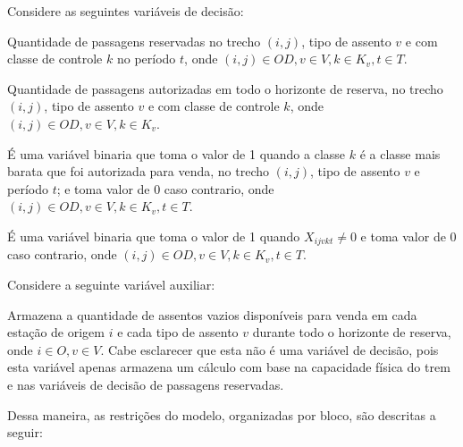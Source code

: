 Considere as seguintes variáveis de decisão:
\begin{description}[style=unboxed, leftmargin=2.5cm, labelindent=1.5cm]
	\setlength{\itemsep}{-2.2em} %
	\setlength{\parskip}{0em} %
	\item[$X_{ijvkt}:$] Quantidade de passagens reservadas no trecho $(i,j)$, tipo de assento $v$ e com classe de controle $k$ no período $t$, onde $(i,j) \in OD, v \in V, k \in K_v, t \in T$.  \\
	\item[$Y_{ijvk}:$] Quantidade de passagens autorizadas em todo o horizonte de reserva, no trecho $(i,j)$, tipo de assento $v$ e com classe de controle $k$, onde $(i,j) \in OD, v \in V, k \in K_v$.\\
	\item[$\beta_{ijvkt}:$] É uma variável binaria que toma o valor de 1 quando a classe $k$ é a classe mais barata que foi autorizada para venda, no trecho $(i,j)$, tipo de assento $v$ e período $t$; e toma  valor de 0 caso contrario, onde $(i,j) \in OD, v \in V, k \in K_v, t \in T$.  \\
	\item[$\alpha_{ijvkt}:$] É uma variável binaria que toma o valor de 1 quando $X_{ijvkt} \neq 0$ e toma  valor de 0 caso contrario, onde $(i,j) \in OD, v \in V, k \in K_v, t \in T$.
\end{description}

Considere a seguinte variável auxiliar:
\begin{description}[style=unboxed, leftmargin=2.5cm, labelindent=1.5cm]
	\setlength{\itemsep}{-2.2em} %
	\setlength{\parskip}{0em} %
	\item[$A_{iv}:$] Armazena a quantidade de assentos vazios disponíveis para venda em cada estação de origem $i$ e cada tipo de assento $v$ durante todo o horizonte de reserva, onde $i \in O, v \in V$. Cabe esclarecer que esta não é uma variável de decisão, pois esta variável apenas armazena um cálculo com base na capacidade física do trem e nas variáveis de decisão de passagens reservadas.
\end{description}

Dessa maneira, as restrições do modelo, organizadas por bloco, são descritas a seguir:


